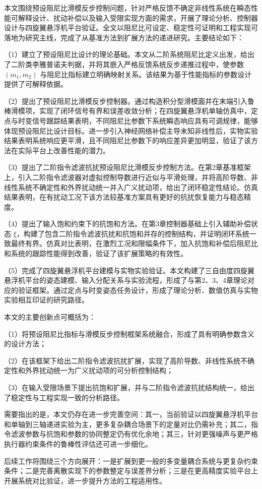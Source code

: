 
\begin{conclusions}

本文围绕预设阻尼比滑模反步控制问题，针对严格反馈不确定非线性系统在瞬态性能可解释设计、扰动补偿以及输入受限实现方面的需求，开展了理论分析、控制器设计与四旋翼悬浮机平台验证。全文以阻尼比可设定、稳定性可证明和工程实现可落地为研究主线，完成了从基准方法到扩展方法的递进研究。主要结论如下：

（1）建立了预设阻尼比设计的理论基础。本文从二阶系统阻尼比定义出发，给出了二阶类李雅普诺夫判据，并将其嵌入严格反馈系统反步递推过程中，使参数 $(m_1,m_2)$ 与阻尼比指标建立明确映射关系。该结果为基于性能指标的参数设计提供了可解释依据。

（2）提出了预设阻尼比滑模反步控制器。通过构造积分型滑模面并在末端引入鲁棒滑模项，实现了闭环信号有界和误差收敛分析；在四旋翼悬浮机单轴仿真中，定点与时变信号跟踪结果表明，不同阻尼比参数下系统瞬态响应具有可调规律，能够体现预设阻尼比设计目标。进一步引入神经网络补偿主导未知非线性后，实物实验结果表明系统响应更平滑，且不同阻尼比参数下的响应差异更加明显，验证了该方法在实际平台上改善性能的潜力。

（3）提出了二阶指令滤波抗扰预设阻尼比滑模反步控制方法。在第2章基准框架上，引入二阶指令滤波器对虚拟控制导数进行近似与平滑处理，并将高阶导数、非线性系统不确定性和外界扰动统一并入广义扰动项，给出了闭环稳定性结论。仿真结果表明，在有扰动工况下该方法较基准方案具有更好的抗扰恢复能力与稳态精度。

（4）提出了输入饱和约束下的抗饱和方法。在第3章控制器基础上引入辅助补偿状态 $\xi$，构建了包含二阶指令滤波抗扰和抗饱和并存的控制结构，并证明闭环系统一致最终有界。仿真对比表明，在激烈工况和限幅条件下，加入抗饱和补偿后阻尼比和系统的跟踪性能得到改善，验证了该扩展策略的有效性。

（5）完成了四旋翼悬浮机平台建模与实物实验验证。本文构建了三自由度四旋翼悬浮机平台的姿态建模、输入分配关系与实验流程，形成了与第2、3、4章理论对应的验证框架。通过定点与时变姿态任务设计，形成了理论分析、数值仿真与实物实验相互印证的研究路径。

本文的主要创新点可概括为：

（1）将预设阻尼比指标与滑模反步控制框架系统融合，形成了具有明确参数含义的设计方法；

（2）在该框架下给出二阶指令滤波抗扰扩展，实现了高阶导数、非线性系统不确定性和外界扰动统一为广义扰动项的可分析控制结构；

（3）在输入受限场景下提出抗饱和扩展，并与二阶指令滤波抗扰结构统一，给出了稳定性与工程实现一致的分析路径。

需要指出的是，本文仍存在进一步完善空间：其一，当前验证以四旋翼悬浮机平台和单轴到三轴递进实验为主，更多复杂耦合场景下的定量对比仍需补充；其二，指令滤波参数与抗饱和参数的协同整定仍有优化余地；其三，针对更强噪声与更严格执行器约束条件的鲁棒性评估还可进一步细化。

后续工作将围绕三个方向展开：一是扩展到更一般的多变量耦合系统与更复杂约束条件；二是完善离散实现下的参数整定与误差界分析；三是在更高精度实验平台上开展系统对比验证，进一步提升方法的工程适用性。

    \end{conclusions}
    
    

